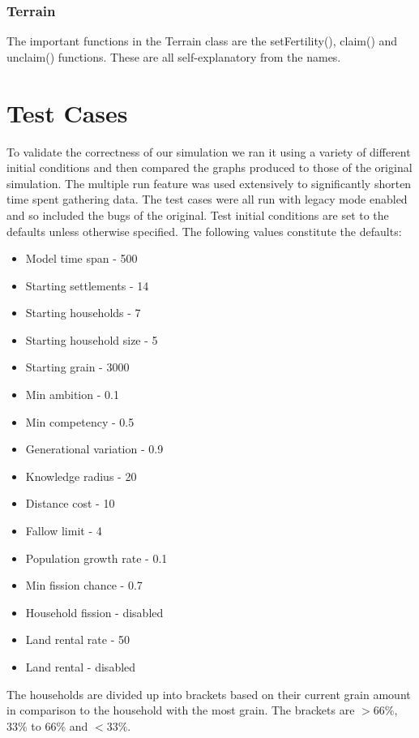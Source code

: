 \documentclass[12pt]{article}
\begin{document}
			\subsubsection{Terrain}
				The important functions in the Terrain class are the setFertility(), claim() and unclaim() functions. These are all self-explanatory from the names.
	
	\section{Test Cases}
		To validate the correctness of our simulation we ran it using a variety of different initial conditions and then compared the graphs produced to those of the original simulation. The multiple run feature was used extensively to significantly shorten time spent gathering data. The test cases were all run with legacy mode enabled and so included the bugs of the original. Test initial conditions are set to the defaults unless otherwise specified. The following values constitute the defaults:\\
		\begin{itemize}
			\itemsep-0.5em 
			\item Model time span - 500
			\item Starting settlements - 14
			\item Starting households - 7
			\item Starting household size  - 5
			\item Starting grain - 3000
			\item Min ambition - 0.1
			\item Min competency - 0.5
			\item Generational variation - 0.9
			\item Knowledge radius - 20
			\item Distance cost - 10
			\item Fallow limit - 4
			\item Population growth rate - 0.1
			\item Min fission chance - 0.7
			\item Household fission - disabled
			\item Land rental rate - 50
			\item Land rental - disabled
		\end{itemize}
		
		The households are divided up into brackets based on their current grain amount in comparison to the household with the most grain. The brackets are $>66\%$, $33\%$ to $66\%$ and $<33\%$.
	
\end{document}
